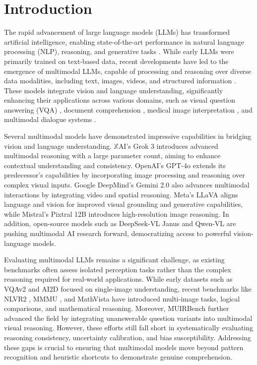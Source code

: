 \section{Introduction}


The rapid advancement of large language models (LLMs) has transformed artificial intelligence, enabling state-of-the-art performance in natural language processing (NLP), reasoning, and generative tasks \cite{brown2020language, chowdhery2022palm, touvron2023llama}. While early LLMs were primarily trained on text-based data, recent developments have led to the emergence of multimodal LLMs, capable of processing and reasoning over diverse data modalities, including text, images, videos, and structured information \cite{liu2023visual} \cite{chen2024mistral, openai2024gpt4o}. These models integrate vision and language understanding, significantly enhancing their applications across various domains, such as visual question answering (VQA) \cite{antol2015vqa, lu2022learn}, document comprehension \cite{mathew2021docvqa, huang2023layoutlm}, medical image interpretation \cite{wang2023biomedclip, mohta2023biogpt}, and multimodal dialogue systems \cite{shuster2021multi, zhu2024chat}.

Several multimodal models have demonstrated impressive capabilities in bridging vision and language understanding. $\mathbb{X}$AI's Grok 3 \cite{xai2025grok3} introduces advanced multimodal reasoning with a large parameter count, aiming to enhance contextual understanding and consistency. OpenAI’s GPT-4o \cite{openai2024gpt4o} extends its predecessor’s capabilities by incorporating image processing and reasoning over complex visual inputs. Google DeepMind’s Gemini 2.0 \cite{deepmind2024gemini} also advances multimodal interactions by integrating video and spatial reasoning. Meta’s LLaVA \cite{liu2023visual} aligns language and vision for improved visual grounding and generative capabilities, while Mistral's Pixtral 12B \cite{agrawal2024pixtral} introduces high-resolution image reasoning. In addition, open-source models such as DeepSeek-VL Janus \cite{deepseek2024vl} and Qwen-VL \cite{bai2023qwen} are pushing multimodal AI research forward, democratizing access to powerful vision-language models.

Evaluating multimodal LLMs remains a significant challenge, as existing benchmarks often assess isolated perception tasks rather than the complex reasoning required for real-world applications. While early datasets such as VQAv2 \cite{goyal2017making} and AI2D \cite{kembhavi2016diagram} focused on single-image understanding, recent benchmarks like NLVR2 \cite{suhr2019nlvr2}, MMMU \cite{yue2024mmmu}, and MathVista \cite{mathvista} have introduced multi-image tasks, logical comparisons, and mathematical reasoning. Moreover, MUIRBench \cite{wang2024muirbench} further advanced the field by integrating unanswerable question variants into multimodal visual reasoning. However, these efforts still fall short in systematically evaluating reasoning consistency, uncertainty calibration, and bias susceptibility. Addressing these gaps is crucial to ensuring that multimodal models move beyond pattern recognition and heuristic shortcuts to demonstrate genuine comprehension. 


